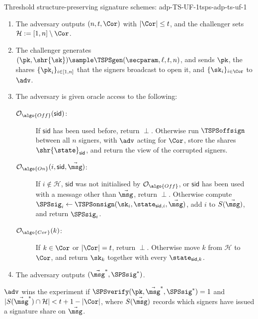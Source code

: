 \begin{experimentbox}{Threshold structure-preserving signature schemes: adp-TS-UF-1}{tsps-adp-ts-uf-1}

  \begin{enumerate}

    \item The adversary outputs $(n, t, \Cor)$ with $|\Cor| \leq t$, and the
challenger sets $\mathcal{H} := [1,n] \setminus \Cor$.

    \item The challenger generates $(\pk, \shr{\sk}) \sample \TSPSgen(\secparam,
\ell, t, n)$, and sends $\pk$, the shares $\{\pk_i\}_{i \in [1,n]}$ that the
signers broadcast to open it, and $\{\sk_i\}_{i \in \Cor}$ to $\adv$.

    \item The adversary is given oracle access to the following:

      \begin{description}

	\item[$\mathcal{O}_{\algo{Off}}(\mathsf{sid})$:] If $\mathsf{sid}$ has
been used before, return $\perp$. Otherwise run $\TSPSoffsign$ between all $n$
signers, with $\adv$ acting for $\Cor$, store the shares
$\shr{\state}_{\mathsf{sid}}$, and return the view of the corrupted signers.

	\item[$\mathcal{O}_{\algo{On}}(i, \mathsf{sid}, \vec{\msg})$:] If $i
\notin \mathcal{H}$, $\mathsf{sid}$ was not initialised by
$\mathcal{O}_{\algo{Off}}$, or $\mathsf{sid}$ has been used with a message other
than $\vec{\msg}$, return $\perp$. Otherwise compute $\SPSsig_i \leftarrow
\TSPSonsign(\sk_i, \state_{\mathsf{sid},i}, \vec{\msg})$, add $i$ to
$S(\vec{\msg})$, and return $\SPSsig_i$.

	\item[$\mathcal{O}_{\algo{Cor}}(k)$:] If $k \in \Cor$ or $|\Cor| = t$,
return $\perp$. Otherwise move $k$ from $\mathcal{H}$ to $\Cor$, and return
$\sk_k$ together with every $\state_{\mathsf{sid},k}$.

      \end{description}

    \item The adversary outputs $(\vec{\msg}^*, \SPSsig^*)$.

  \end{enumerate}

  $\adv$ wins the experiment if $\SPSverify(\pk, \vec{\msg}^*, \SPSsig^*) = 1$
and $|S(\vec{\msg}^*) \cap \mathcal{H}| < t + 1 - |\Cor|$, where
$S(\vec{\msg})$ records which signers have issued a signature share on
$\vec{\msg}$.

\end{experimentbox}

